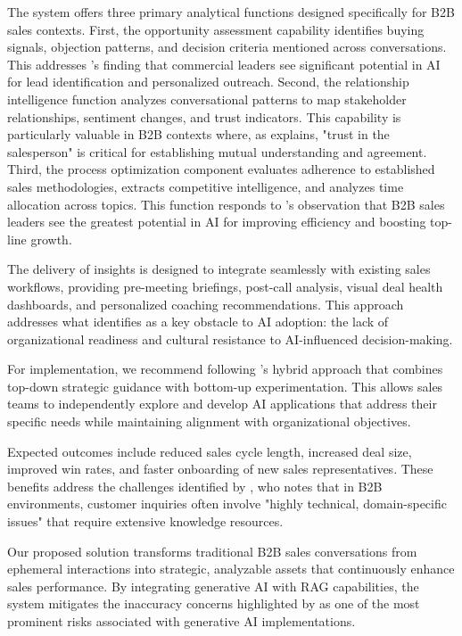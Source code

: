 The system offers three primary analytical functions designed specifically for B2B sales contexts. First, the opportunity assessment capability identifies buying signals, objection patterns, and decision criteria mentioned across conversations. This addresses \cite{deveau2023ai}'s finding that commercial leaders see significant potential in AI for lead identification and personalized outreach. Second, the relationship intelligence function analyzes conversational patterns to map stakeholder relationships, sentiment changes, and trust indicators. This capability is particularly valuable in B2B contexts where, as \cite{forsell2024competitive} explains, "trust in the salesperson" is critical for establishing mutual understanding and agreement. Third, the process optimization component evaluates adherence to established sales methodologies, extracts competitive intelligence, and analyzes time allocation across topics. This function responds to \cite{yee2024unconstrained}'s observation that B2B sales leaders see the greatest potential in AI for improving efficiency and boosting top-line growth.

The delivery of insights is designed to integrate seamlessly with existing sales workflows, providing pre-meeting briefings, post-call analysis, visual deal health dashboards, and personalized coaching recommendations. This approach addresses what \cite{cooper2024adoption} identifies as a key obstacle to AI adoption: the lack of organizational readiness and cultural resistance to AI-influenced decision-making.

For implementation, we recommend following \cite{marion2024generative}'s hybrid approach that combines top-down strategic guidance with bottom-up experimentation. This allows sales teams to independently explore and develop AI applications that address their specific needs while maintaining alignment with organizational objectives.

Expected outcomes include reduced sales cycle length, increased deal size, improved win rates, and faster onboarding of new sales representatives. These benefits address the challenges identified by \cite{reinhard2024generative}, who notes that in B2B environments, customer inquiries often involve "highly technical, domain-specific issues" that require extensive knowledge resources.

Our proposed solution transforms traditional B2B sales conversations from ephemeral interactions into strategic, analyzable assets that continuously enhance sales performance. By integrating generative AI with RAG capabilities, the system mitigates the inaccuracy concerns highlighted by \cite{mckinsey2024} as one of the most prominent risks associated with generative AI implementations.